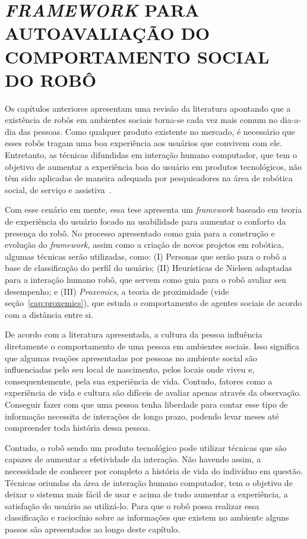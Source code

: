 \chapter{\emph{FRAMEWORK} PARA AUTOAVALIAÇÃO DO COMPORTAMENTO SOCIAL DO ROBÔ}
\label{cap:proposta}

Os capítulos anteriores apresentam uma revisão da literatura apontando que a existência de robôs em ambientes sociais torna-se cada vez mais comum no dia-a-dia das pessoas. Como qualquer produto existente no mercado, é necessário que esses robôs tragam uma boa experiência aos usuários que convivem com ele. Entretanto, as técnicas difundidas em interação humano computador, que tem o objetivo de aumentar a experiência boa do usuário em produtos tecnológicos, não têm sido aplicadas de maneira adequada por pesquisadores na área de robótica social, de serviço e assistiva~\cite{alenljung:2017}.

Com esse cenário em mente, essa tese apresenta um \emph{framework} baseado em teoria de experiência do usuário focado na usabilidade para aumentar o conforto da presença do robô. No processo apresentado como guia para a construção e evolução do \emph{framework}, assim como a criação de novos projetos em robótica, algumas técnicas serão utilizadas, como: (I) Personas que serão para o robô a base de classificação do perfil do usuário; (II) Heurísticas de Nielsen adaptadas para a interação humano robô, que servem como guia para o robô avaliar seu desempenho; e (III) \emph{Proxemics}, a teoria de proximidade (vide seção~\ref{cap:proxemics}), que estuda o comportamento de agentes sociais de acordo com a distância entre si.

De acordo com a literatura apresentada, a cultura da pessoa influência diretamente o comportamento de uma pessoa em ambientes sociais. Isso significa que algumas reações apresentadas por pessoas no ambiente social são influenciadas pelo seu local de nascimento, pelos locais onde viveu e, consequentemente, pela sua experiência de vida. Contudo, fatores como a experiência de vida e cultura são difíceis de avaliar apenas através da observação. Conseguir fazer com que uma pessoa tenha liberdade para contar esse tipo de informação necessita de interações de longo prazo, podendo levar meses até compreender toda história dessa pessoa.

Contudo, o robô sendo um produto tecnológico pode utilizar técnicas que são capazes de aumentar a efetividade da interação. Não havendo assim, a necessidade de conhecer por completo a história de vida do indivíduo em questão. Técnicas oriundas da área de interação humano computador, tem o objetivo de deixar o sistema mais fácil de usar e acima de tudo aumentar a experiência, a satisfação do usuário ao utilizá-lo. Para que o robô possa realizar essa classificação e raciocínio sobre as informações que existem no ambiente alguns passos são apresentados ao longo deste capítulo.

